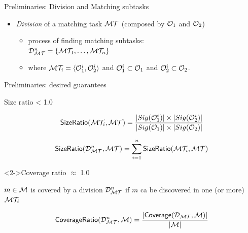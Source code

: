 \documentclass[t]{beamer}
\begin{document}
\begin{frame}{Preliminaries: Division and Matching subtasks}
	
  		\begin{itemize}    
  		 
  		  \item \emph{Division} of a matching task $\mathcal{M}\mathcal{T}$ (composed by
$\mathcal{O}_1$ and $\mathcal{O}_2$) 
		\begin{itemize}
			\item process of finding matching subtasks: \\
			$\mathcal{D}_{\mathcal{M}\mathcal{T}}^{n}=\{\mathcal{M}\mathcal{T}_1,\ldots,\mathcal{M}\mathcal{T}_n\}$
			\item where $\mathcal{M}\mathcal{T}_{i}=\langle \mathcal{O}_1^{i}, \mathcal{O}_2^{i} \rangle$ and  $\mathcal{O}_1^{i} \subset \mathcal{O}_1$ and $\mathcal{O}_2^{i} \subset
\mathcal{O}_2$. 
		\end{itemize}
  	
  	
		\end{itemize}
  	
\end{frame}



\begin{frame}{Preliminaries: desired guarantees}
	
	\begin{block}{Size ratio < 1.0}
	
	\begin{equation*}
    	\mathsf{SizeRatio}(\mathcal{M}\mathcal{T}_i, \mathcal{M}\mathcal{T}) = \frac{\lvert Sig(\mathcal{O}_1^{i}) \rvert
    	\times \lvert Sig(\mathcal{O}_2^{i}) \rvert} {\lvert Sig(\mathcal{O}_1) \rvert \times
    	\lvert Sig(\mathcal{O}_2)\rvert}
	\end{equation*}

	\begin{equation*}
    	\mathsf{SizeRatio}(\mathcal{D}_{\mathcal{M}\mathcal{T}}^{n}, \mathcal{M}\mathcal{T}) =
    	\sum_{i=1}^{n}\mathsf{SizeRatio}(\mathcal{M}\mathcal{T}_i, \mathcal{M}\mathcal{T})
	\end{equation*}
	
	
	\end{block}
	
  	
  	\begin{block}<2->{Coverage ratio $\approx$ 1.0}
  	
  	$m\in\mathcal{M}$ is covered by a division $\mathcal{D}_{\mathcal{M}\mathcal{T}}^{n}$  if $m$ ca be discovered in
  	one (or more) $\mathcal{M}\mathcal{T}_i$
  	
	  	\begin{equation*}
	    \mathsf{CoverageRatio}(\mathcal{D}_{\mathcal{M}\mathcal{T}}^{n}, \mathcal{M}) =
	    \frac{\lvert\mathsf{Coverage}(\mathcal{D}_{\mathcal{M}\mathcal{T}}, \mathcal{M})\rvert} {\lvert \mathcal{M} \rvert}
		\end{equation*}
  	\end{block}
  	
  	
\end{frame}
\end{document}
